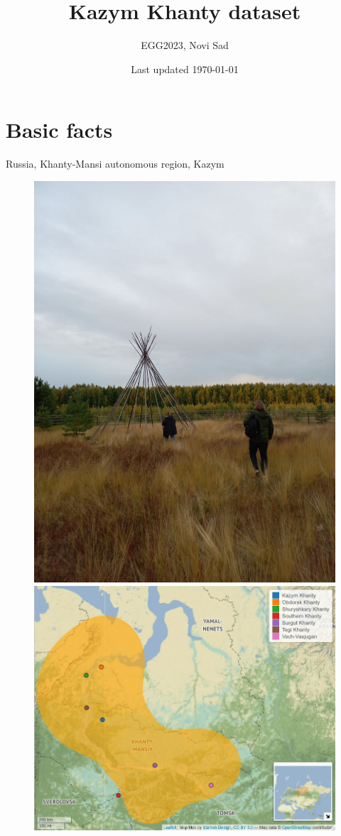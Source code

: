 \documentclass[a4paper, 12pt]{article}
\title{Kazym Khanty dataset}
\author{EGG2023, Novi Sad}
\date{Last updated \today}
\begin{document}
\maketitle

	\section{Basic facts}
	
	Russia, Khanty-Mansi autonomous region, Kazym
	
	\begin{figure}[H]
		\centering
		\includegraphics[scale=.167]{beginning}
		\hfill
		\includegraphics[scale=.4]{map}
	\end{figure}
\end{document}
